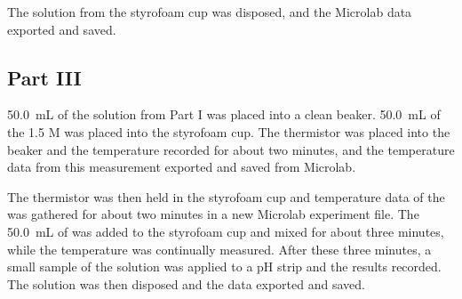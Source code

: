 The solution from the styrofoam cup was disposed, and the Microlab data exported and saved. 

\subsection*{Part III}

\SI{50.0}{mL} of the \koh solution from Part I was placed into a clean beaker. 
\SI{50.0}{mL} of the 1.5 M \hcl was placed into the styrofoam cup.
The thermistor was placed into the \koh beaker and the temperature recorded for about two minutes,
and the temperature data from this measurement exported and saved from Microlab.

The thermistor was then held in the styrofoam cup and temperature data of the \hcl was gathered for about two minutes in a new Microlab experiment file. 
The \SI{50.0}{mL} of \koh was added to the styrofoam cup and mixed for about three minutes, while the temperature was continually measured. 
After these three minutes, a small sample of the solution was applied to a pH strip and the results recorded. 
The solution was then disposed and the data exported and saved. 

